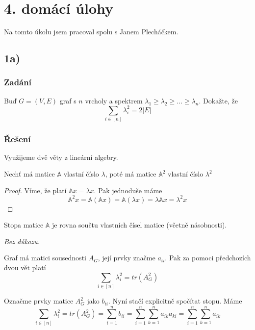 \documentclass[../main.tex]{subfiles}
\begin{document}
\section{4. domácí úlohy}

Na tomto úkolu jsem pracoval spolu s Janem Plecháčkem.

\subsection{1a)}
\subsubsection*{Zadání}
Buď $G=(V,E)$ graf s $n$ vrcholy a spektrem $\lambda_1 \geq \lambda_2 \geq \dots \geq \lambda_n$. 
Dokažte, že\begin{equation*}
    \sum_{i\in[n]} \lambda_i^2 = 2|E|
\end{equation*}


\subsubsection*{Řešení}

Využijeme dvě věty z lineární algebry. 

\begin{lemma*}
    Nechť má matice $\mathbb{A}$ vlastní číslo $\lambda$, poté má matice $\mathbb{A}^2$ vlastní číslo $\lambda^2$
\end{lemma*}
\begin{proof}
    Víme, že platí $\mathbb{A}x = \lambda x$. Pak jednoduše máme 
    \begin{equation*}
        \mathbb{A}^2x = \mathbb{A}(\mathbb{A}x) = \mathbb{A}(\lambda x) = \lambda \mathbb{A} x = \lambda^2 x
    \end{equation*}
\end{proof}

\begin{lemma*}
    Stopa matice $\mathbb{A}$ je rovna součtu vlastních čísel matice (včetně násobnosti).

    \textit{Bez důkazu.}
\end{lemma*}


Graf má matici sousednosti $A_G$, její prvky značme $a_{ii}$. Pak za pomoci předchozích dvou vět platí 
\begin{equation*}
    \sum_{i\in[n]} \lambda_i^2 = tr(A_G^2)
\end{equation*} 


Označme prvky matice $A_G^2$ jako $b_{ii}$. Nyní stačí explicitně spočítat stopu. Máme
\begin{equation*}
    \sum_{i\in[n]} \lambda_i^2 = tr(A_G^2) = \sum_{i=1}^n b_{ii} = \sum_{i=1}^n \sum_{k=1}^n a_{ik}a_{ki} = \sum_{i=1}^n \sum_{k=1}^n a_{ik}
\end{equation*} 
\end{document}

